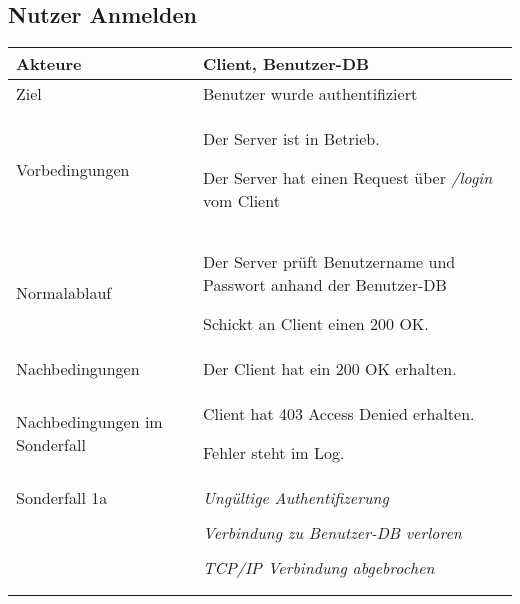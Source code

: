 \documentclass[a4paper,10pt,titlepage]{article}
\makeatletter
\newcommand\novspace{\@minipagetrue}
\newenvironment{owncompactitem}{%
\compactitem
}{%
\@finalstrut\@arstrutbox
\@nameuse{endcompactitem}%
\aftergroup\let\aftergroup\@finalstrut\aftergroup\@gobble
}
\newenvironment{owncompactenum}{%
\compactenum
}{%
\@finalstrut\@arstrutbox
\@nameuse{endcompactenum}%
\aftergroup\let\aftergroup\@finalstrut\aftergroup\@gobble
}
\newcommand{\usecase}[7]
{\subsection{#1}
\setlength{\extrarowheight}{2pt}
\begin{tabular}{|p{0.2\textwidth}|p{0.9\textwidth}|}
\hline
  Akteure & #2\\\hline
  Ziel & #3\\\hline
  Vorbedingungen & \novspace
  	\begin{owncompactitem}[-] #4 \end{owncompactitem} \\\hline
  Normalablauf & \vspace{-7pt}
  	\begin{owncompactenum}[1.] #6 \end{owncompactenum} \\\hline
  Nachbedingungen & \novspace
  	\begin{owncompactitem}[-] #5 \end{owncompactitem} \\\hline
  #7
\end{tabular}
}
\newcommand{\sonderfall}[4][\empty]
{
Sonderfall #2 & \vspace{-10pt}
	\textit{#3}
	\begin{owncompactenum}[{#2}.1] {#4} \end{owncompactenum}
  	\ifthenelse{\equal{#1}{\empty}}
    	{\\\hline} %
    	{\ensuremath{\rightarrow} #1 \\ [+1pt] \hline} %

}
\newcommand{\sondernachbedingung}[1]
{
Nachbedingungen im Sonderfall& \novspace
	\begin{owncompactitem}[-]
		#1
	\end{owncompactitem} \\\hline
}
\makeatother
\begin{document}
\usecase{Nutzer Anmelden}{Client, Benutzer-DB}%
{Benutzer wurde authentifiziert}%
{%
  \item Der Server ist in Betrieb.
  \item Der Server hat einen Request über \textit{/login} vom Client
}
{%
  \item Der Client hat ein 200 OK erhalten.
}
{%
  \item Der Server prüft Benutzername und Passwort anhand der Benutzer-DB
  \item Schickt an Client einen 200 OK.
}
{%
  \sondernachbedingung{
	\item Client hat 403 Access Denied erhalten.
	\item Fehler steht im Log.
	}
	\sonderfall[Weiter mit normalem Betrieb]{1a}
    {Ungültige Authentifizerung}
    {
    \item Fehler wird ins Log geschrieben
  	\item Der Client erhält eine entsprechende Fehlermeldung mit HTTP-Status 403 Access Denied
    }
	
  
	\sonderfall[Kritischer Fehler, Server ist beendet]{*}%
	{Verbindung zu Benutzer-DB verloren}%
  	{
	\item Der Fehler wird ins Log geschrieben (als schwerwiegender Fehler)
	\item Der Client erhält eine entsprechende Fehlermeldung
	\item Der Server wird beendet
  	}

\sonderfall[Weiter mit normalem Betrieb]{**}%
	{TCP/IP Verbindung abgebrochen}%
	{
	\item Fehlermeldung wird ins Log geschrieben
	}
}
\end{document}
